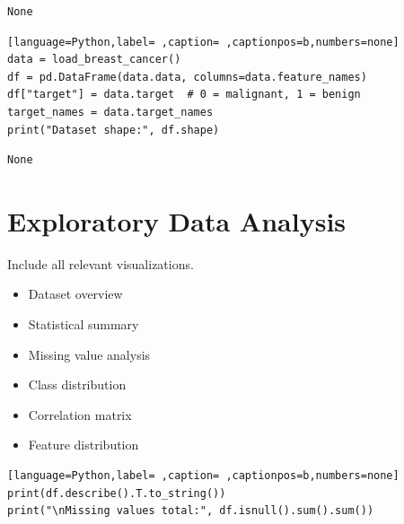\documentclass[12pt,a4paper]{article}
\begin{document}
\begin{verbatim}
None
\end{verbatim}


\begin{lstlisting}[language=Python,label= ,caption= ,captionpos=b,numbers=none]
data = load_breast_cancer()
df = pd.DataFrame(data.data, columns=data.feature_names)
df["target"] = data.target  # 0 = malignant, 1 = benign
target_names = data.target_names
print("Dataset shape:", df.shape)
\end{lstlisting}

\begin{verbatim}
None
\end{verbatim}

\section{Exploratory Data Analysis}
\label{sec:orgabe438c}
Include all relevant visualizations.
\begin{itemize}
\item Dataset overview
\item Statistical summary
\item Missing value analysis
\item Class distribution
\item Correlation matrix
\item Feature distribution
\end{itemize}

\begin{lstlisting}[language=Python,label= ,caption= ,captionpos=b,numbers=none]
print(df.describe().T.to_string())
print("\nMissing values total:", df.isnull().sum().sum())
\end{lstlisting}
\end{document}
